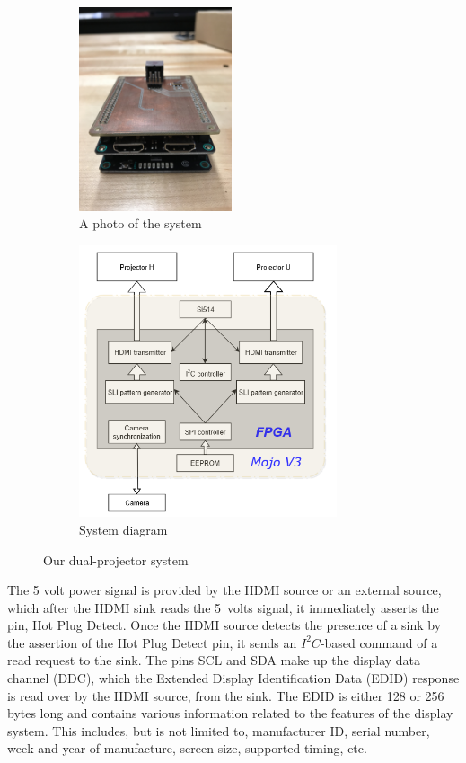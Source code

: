 \documentclass[]{spie}  %
\begin{document}
\begin{figure}
\centering
\begin{subfigure}{.5\textwidth}
  \centering
  \includegraphics[height=6cm, angle=90]{mojo.jpg}
  \caption{A photo of the system}
  \label{fig:sub1}
\end{subfigure}%
\begin{subfigure}{.5\textwidth}
  \centering
   \includegraphics[height=8cm]{sysdgv3.png}
  \caption{System diagram}
  \label{fig:sub2}
\end{subfigure}
\caption{Our dual-projector system}
\label{Fig:2}
\end{figure}

The 5 volt power signal is provided by the HDMI source or an external source, which after the HDMI sink reads the 5~volts signal, it immediately asserts the pin, Hot Plug Detect. Once the HDMI source detects the presence of a sink by the assertion of the Hot Plug Detect pin, it sends an $I^2C$-based command of a read request to the sink. The pins SCL and SDA make up the display data channel (DDC), which the Extended Display Identification Data (EDID) response is read over by the HDMI source, from the sink. The EDID is either 128 or 256 bytes long and contains various information related to the features of the display system. This includes, but is not limited to, manufacturer ID, serial number, week and year of manufacture, screen size, supported timing, etc.
\end{document}
